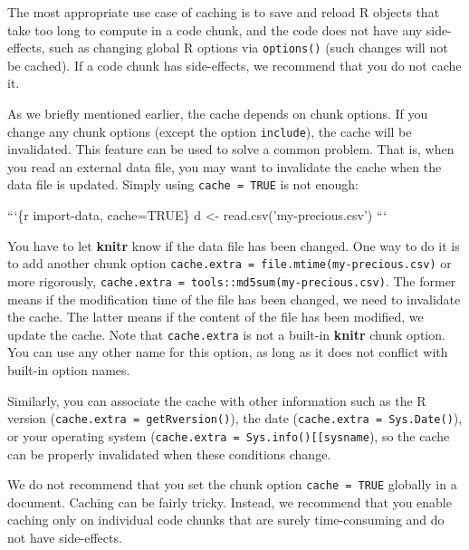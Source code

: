 \documentclass[
  11pt,
]{krantz}
\newenvironment{Shaded}{\begin{snugshade}}{\end{snugshade}}
\newcommand{\BaseNTok}[1]{\textcolor[rgb]{0.06,0.06,0.06}{#1}}
\begin{document}
The most appropriate use case of caching is to save and reload R objects that take too long to compute in a code chunk, and the code does not have any side-effects, such as changing global R options via \texttt{options()} (such changes will not be cached). If a code chunk has side-effects, we recommend that you do not cache it.

As we briefly mentioned earlier, the cache depends on chunk options. If you change any chunk options (except the option \texttt{include}), the cache will be invalidated. This feature can be used to solve a common problem. That is, when you read an external data file, you may want to invalidate the cache when the data file is updated. Simply using \texttt{cache\ =\ TRUE} is not enough:

\begin{Shaded}
\begin{Highlighting}[]
\BaseNTok{```\{r import-data, cache=TRUE\}}
\BaseNTok{d <- read.csv('my-precious.csv')}
\BaseNTok{```}
\end{Highlighting}
\end{Shaded}

You have to let \textbf{knitr} know if the data file has been changed. One way to do it is to add another chunk option \texttt{cache.extra\ =\ file.mtime(\textquotesingle{}my-precious.csv\textquotesingle{})} or more rigorously, \texttt{cache.extra\ =\ tools::md5sum(\textquotesingle{}my-precious.csv\textquotesingle{})}. The former means if the modification time of the file has been changed, we need to invalidate the cache. The latter means if the content of the file has been modified, we update the cache. Note that \texttt{cache.extra} is not a built-in \textbf{knitr} chunk option. You can use any other name for this option, as long as it does not conflict with built-in option names.

Similarly, you can associate the cache with other information such as the R version (\texttt{cache.extra\ =\ getRversion()}), the date (\texttt{cache.extra\ =\ Sys.Date()}), or your operating system (\texttt{cache.extra\ =\ Sys.info(){[}{[}\textquotesingle{}sysname\textquotesingle{}{]}{]}}), so the cache can be properly invalidated when these conditions change.

We do not recommend that you set the chunk option \texttt{cache\ =\ TRUE} globally in a document. Caching can be fairly tricky. Instead, we recommend that you enable caching only on individual code chunks that are surely time-consuming and do not have side-effects.
\end{document}
